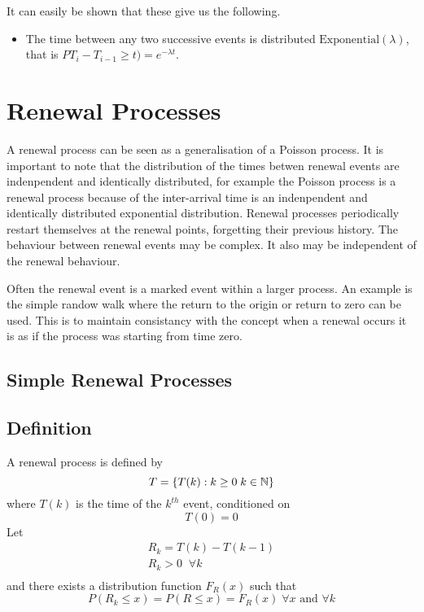 It can easily be shown that these give us the following.

\begin{itemize}
\item	The time between any two successive events is distributed
$\mbox{Exponential}(\lambda)$, that is $PT_i - T_{i-1} \geq t) =
e^{-\lambda t}$.

\end{itemize}

\section{Renewal Processes}

A renewal process can be seen as a generalisation of a Poisson
process.  It is important to note that the distribution of the times
betwen renewal events are indenpendent and identically distributed,
for example the Poisson process is a renewal process because of the
inter-arrival time is an indenpendent and identically distributed
exponential distribution.  Renewal processes periodically restart
themselves at the renewal points, forgetting their previous history.
The behaviour between renewal events may be complex.  It also may be
independent of the renewal behaviour.

Often the renewal event is a marked event within a larger process.  An
example is the simple randow walk where the return to the origin or
return to zero can be used.  This is to maintain consistancy with the
concept when a renewal occurs it is as if the process was starting
from time zero.

\subsection{Simple Renewal Processes}

\subsection{Definition}

A renewal process is defined by
\[ T = \{T(k) : k \geq 0 \; k \in {\Bbb N} \} \]
where $T(k)$ is the time of the $k^{th}$ event, conditioned on
\[ T(0) = 0 \]
Let
\[ \begin{array}{c}
R_k = T(k) - T(k-1) \\
R_k > 0 \; \; \forall k \\
\end{array}
\]
and there exists a distribution function $F_R(x)$ such that
\[ P(R_k \leq x) = P(R \leq x) = F_R(x) \; \forall x \mbox{ and } \forall k \]

